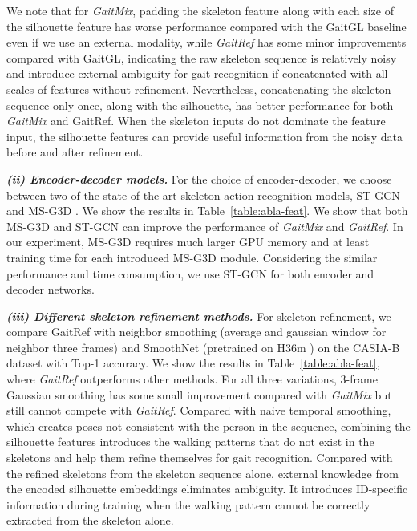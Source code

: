 \documentclass[10pt,twocolumn,letterpaper]{article}
\begin{document}
    We note that for \textit{GaitMix}, padding the skeleton feature along with each size of the silhouette feature has worse performance compared with the GaitGL baseline even if we use an external modality, while \textit{GaitRef} has some minor improvements compared with GaitGL, indicating the raw skeleton sequence is relatively noisy and introduce external ambiguity for gait recognition if concatenated with all scales of features without refinement. Nevertheless, concatenating the skeleton sequence only once, along with the silhouette, has better performance for both \textit{GaitMix} and GaitRef. When the skeleton inputs do not dominate the feature input, the silhouette features can provide useful information from the noisy data before and after refinement.
    
    \textbf{\textit{(ii) Encoder-decoder models.}} For the choice of encoder-decoder, we choose between two of the state-of-the-art skeleton action recognition models, ST-GCN \cite{yan2018spatial} and MS-G3D \cite{liu2020disentangling}. We show the results in Table~\ref{table:abla-feat}. We show that both MS-G3D and ST-GCN can improve the performance of \textit{GaitMix} and \textit{GaitRef}. In our experiment, MS-G3D requires much larger GPU memory and at least  training time for each introduced MS-G3D module. Considering the similar performance and time consumption, we use ST-GCN for both encoder and decoder networks.
    
    \textbf{\textit{(iii) Different skeleton refinement methods.}} For skeleton refinement, we compare GaitRef with neighbor smoothing (average and gaussian window for neighbor three frames) and SmoothNet \cite{zeng2021smoothnet} (pretrained on H36m \cite{ionescu2013human3}) on the CASIA-B dataset with Top-1 accuracy. We show the results in Table~\ref{table:abla-feat}, where \textit{GaitRef} outperforms other methods. 
    For all three variations, 3-frame Gaussian smoothing has some small improvement compared with \textit{GaitMix} but still cannot compete with \textit{GaitRef}.
    Compared with naive temporal smoothing, which creates poses not consistent with the person in the sequence, combining the silhouette features introduces the walking patterns that do not exist in the skeletons and help them refine themselves for gait recognition. Compared with the refined skeletons from the skeleton sequence alone, external knowledge from the encoded silhouette embeddings eliminates ambiguity. It introduces ID-specific information during training when the walking pattern cannot be correctly extracted from the skeleton alone.
\end{document}
